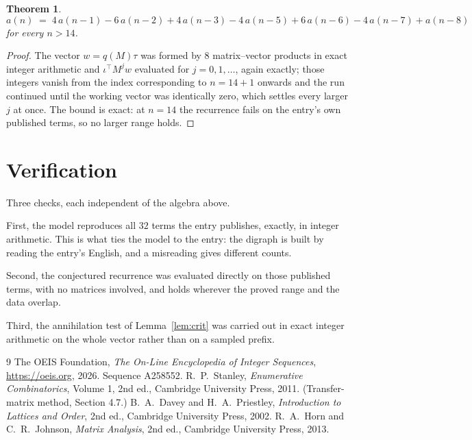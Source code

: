 \documentclass[11pt,a4paper]{article}
\theoremstyle{plain}
\newtheorem{theorem}{Theorem}
\theoremstyle{definition}
\begin{document}
\begin{theorem}
\[
a(n)\;=\;4\,a(n-1) - 6\,a(n-2) + 4\,a(n-3) - 4\,a(n-5) + 6\,a(n-6) - 4\,a(n-7) + a(n-8)
\]
for every $n>14$.
\end{theorem}

\begin{proof}
The vector $w=q(M)\tau$ was formed by $8$ matrix--vector products in exact integer
arithmetic and $\iota^{\!\top}M^{j}w$ evaluated for $j=0,1,\dots$, again exactly; those
integers vanish from the index corresponding to $n=14+1$ onwards and the run continued
until the working vector was identically zero, which settles every larger $j$ at once. The bound is exact: at $n=14$ the recurrence fails on the entry's own published terms, so no larger range holds.
\end{proof}

\section{Verification}

Three checks, each independent of the algebra above.

First, the model reproduces all $32$ terms the entry publishes, exactly, in integer
arithmetic. This is what ties the model to the entry: the digraph is built by reading the
entry's English, and a misreading gives different counts.

Second, the conjectured recurrence was evaluated directly on those published terms, with no
matrices involved, and holds wherever the proved range and the data overlap.

Third, the annihilation test of Lemma~\ref{lem:crit} was carried out in exact integer
arithmetic on the whole vector rather than on a sampled prefix.

\begin{thebibliography}{9}
 The OEIS Foundation, \emph{The On-Line Encyclopedia of Integer
Sequences}, \url{https://oeis.org}, 2026. Sequence A258552.
 R.~P.~Stanley, \emph{Enumerative Combinatorics}, Volume 1, 2nd ed.,
Cambridge University Press, 2011. (Transfer-matrix method, Section 4.7.)
 B.~A.~Davey and H.~A.~Priestley, \emph{Introduction to Lattices and
Order}, 2nd ed., Cambridge University Press, 2002.
 R.~A.~Horn and C.~R.~Johnson, \emph{Matrix Analysis}, 2nd ed., Cambridge
University Press, 2013.
\end{thebibliography}
\end{document}
